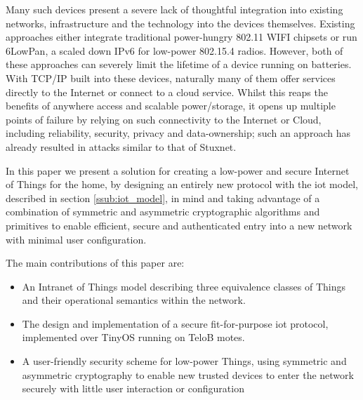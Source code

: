 \documentclass[conference]{./sty/IEEEtran}
\begin{document}
Many such devices present a severe lack of thoughtful integration into existing networks, infrastructure and the technology into the devices themselves. Existing approaches either integrate traditional power-hungry 802.11 WIFI chipsets or run 6LowPan, a scaled down IPv6 for low-power 802.15.4 radios. However, both of these approaches can severely limit the lifetime of a device running on batteries. With TCP/IP built into these devices, naturally many of them offer services directly to the Internet\cite{MQTT,IETF_CORE,Xively} or connect to a cloud service\cite{SmartThings,Twine}. Whilst this reaps the benefits of anywhere access and scalable power/storage, it opens up multiple points of failure by relying on such connectivity to the Internet or Cloud, including reliability, security, privacy and data-ownership; such an approach has already resulted in attacks similar to that of Stuxnet\cite{IoTWorm}.

In this paper we present a solution for creating a low-power and secure Internet of Things for the home, by designing an entirely new protocol with the iot model, described in section \ref{ssub:iot_model}, in mind and taking advantage of a combination of symmetric and asymmetric cryptographic algorithms and primitives to enable efficient, secure and authenticated entry into a new network with minimal user configuration.


The main contributions of this paper are:
\begin{itemize}
  \item An Intranet of Things model describing three equivalence classes of Things and their operational semantics within the network.
  \item The design and implementation of a secure fit-for-purpose iot protocol, implemented over TinyOS running on TeloB motes.
  \item A user-friendly security scheme for low-power Things, using symmetric and asymmetric cryptography to enable new trusted devices to enter the network securely with little user interaction or configuration  
\end{itemize}
\end{document}
